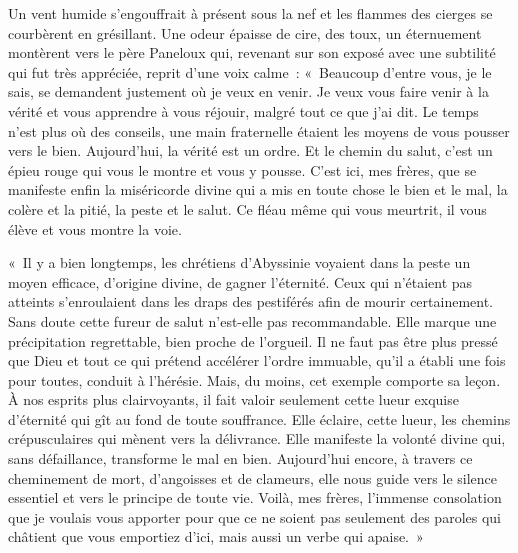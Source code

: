 \documentclass[french,twoside]{book} %
\begin{document}
Un vent humide s’engouffrait à présent sous la nef et les flammes des cierges se courbèrent en grésillant. Une odeur épaisse de cire, des toux, un éternuement montèrent vers le père Paneloux qui, revenant sur son exposé avec une subtilité qui fut très appréciée, reprit d’une voix calme : « Beaucoup d’entre vous, je le sais, se demandent justement où je veux en venir. Je veux vous faire venir à la vérité et vous apprendre à vous réjouir, malgré tout ce que j’ai dit. Le temps n’est plus où des conseils, une main fraternelle étaient les moyens de vous pousser vers le bien. Aujourd’hui, la vérité est un ordre. Et le chemin du salut, c’est un épieu rouge qui vous le montre et vous y pousse. C’est ici, mes frères, que se manifeste enfin la miséricorde divine qui a mis en toute chose le bien et le mal, la colère et la pitié, la peste et le salut. Ce fléau même qui vous meurtrit, il vous élève et vous montre la voie.\par
« Il y a bien longtemps, les chrétiens d’Abyssinie voyaient dans la peste un moyen efficace, d’origine divine, de gagner l’éternité. Ceux qui n’étaient pas atteints s’enroulaient dans les draps des pestiférés afin de mourir certainement. Sans doute cette fureur de salut n’est-elle pas recommandable. Elle marque une précipitation regrettable, bien proche de l’orgueil. Il ne faut pas être plus pressé que Dieu et tout ce qui prétend accélérer l’ordre immuable, qu’il a établi une fois pour toutes, conduit à l’hérésie. Mais, du moins, cet exemple comporte sa leçon. À nos esprits plus clairvoyants, il fait valoir seulement cette lueur exquise d’éternité qui gît au fond de toute souffrance. Elle éclaire, cette lueur, les chemins crépusculaires qui mènent vers la délivrance. Elle manifeste la volonté divine qui, sans défaillance, transforme le mal en bien. Aujourd’hui encore, à travers ce cheminement de mort, d’angoisses et de clameurs, elle nous guide vers le silence essentiel et vers le principe de toute vie. Voilà, mes frères, l’immense consolation que je voulais vous apporter pour que ce ne soient pas seulement des paroles qui châtient que vous emportiez d’ici, mais aussi un verbe qui apaise. »\par
\end{document}
